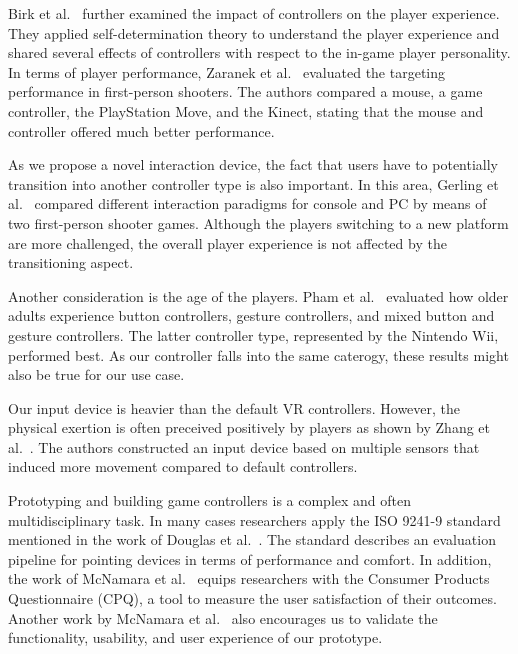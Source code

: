 \documentclass{sigchi}
\begin{document}
Birk et al.~\cite{Birk:2013:CYG:2470654.2470752} further examined the impact of controllers on the player experience. They applied self-determination theory to understand the player experience and shared several effects of controllers with respect to the in-game player personality. In terms of player performance, Zaranek et al.~\cite{zaranek2014performance} evaluated the targeting performance in first-person shooters. The authors compared a mouse, a game controller, the PlayStation Move, and the Kinect, stating that the mouse and controller offered much better performance.

 
As we propose a novel interaction device, the fact that users have to potentially transition into another controller type is also important. In this area, Gerling et al.~\cite{gerling2011measuring} compared different interaction paradigms for console and PC by means of two first-person shooter games. Although the players switching to a new platform are more challenged, the overall player experience is not affected by the transitioning aspect. 

Another consideration is the age of the players. Pham et al.~\cite{Pham:2012:GCO:2282338.2282401} evaluated how older adults experience button controllers, gesture controllers, and mixed button and gesture controllers. The latter controller type, represented by the Nintendo Wii, performed best. As our controller falls into the same caterogy, these results might also be true for our use case.

Our input device is heavier than the default VR controllers. However, the physical exertion is often preceived positively by players as shown by Zhang et al.~\cite{zhang2009game}. The authors constructed an input device based on multiple sensors that induced more movement compared to default controllers.

Prototyping and building game controllers is a complex and often multidisciplinary task. In many cases researchers apply the ISO 9241-9 standard mentioned in the work of Douglas et al.~\cite{Douglas:1999:TPD:302979.303042}. The standard describes an evaluation pipeline for pointing devices in terms of performance and comfort. In addition, the work of McNamara et al.~\cite{McNamara2011375} equips researchers with the Consumer Products Questionnaire (CPQ), a tool to measure the user satisfaction of their outcomes. Another work by McNamara et al.~\cite{mcnamara2006functionality} also encourages us to validate the functionality, usability, and user experience of our prototype.
\end{document}
